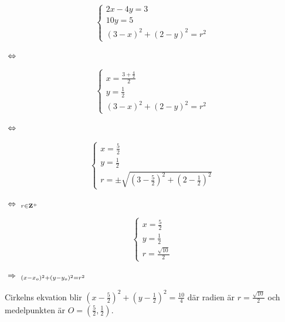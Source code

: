 \documentclass{article}
\begin{document}
\begin{equation*}
    \begin{cases}
        2x-4y=3 \\
        10y=5 \\
        (3-x)^2+(2-y)^2=r^2
    \end{cases}
\end{equation*}

\newpage

$\ \Leftrightarrow \ $

\vskip 0.1cm

\begin{equation*}
    \begin{cases}
        x=\frac{3+\frac{4}{2}}{2} \\
        y=\frac{1}{2} \\
        (3-x)^2+(2-y)^2=r^2
    \end{cases}
\end{equation*}

\vskip 0.1cm

$\ \Leftrightarrow \ $

\vskip 0.1cm

\begin{equation*}
    \begin{cases}
        x=\frac{5}{2} \\
        y=\frac{1}{2} \\
        r=\pm \sqrt{(3-\frac{5}{2})^2+(2-\frac{1}{2})^2}
    \end{cases}
\end{equation*}

\vskip 0.1cm

$\ \Leftrightarrow \ _{r \in \mathbf{Z}^+}$

\vskip 0.1cm

\begin{equation*}
    \begin{cases}
        x=\frac{5}{2} \\
        y=\frac{1}{2} \\
        r=\frac{\sqrt{10}}{2}
    \end{cases}
\end{equation*}

\vskip 0.1cm

$\ \Rightarrow \ _{(x-x_{o})^2+(y-y_{o})^2=r^2}$

\vskip 0.6cm

Cirkelns ekvation blir $(x-\frac{5}{2})^2+(y-\frac{1}{2})^2=\frac{10}{4}$ där radien är $r=\frac{\sqrt{10}}{2}$ och medelpunkten är $O=(\frac{5}{2}, \frac{1}{2})$.
\end{document}
